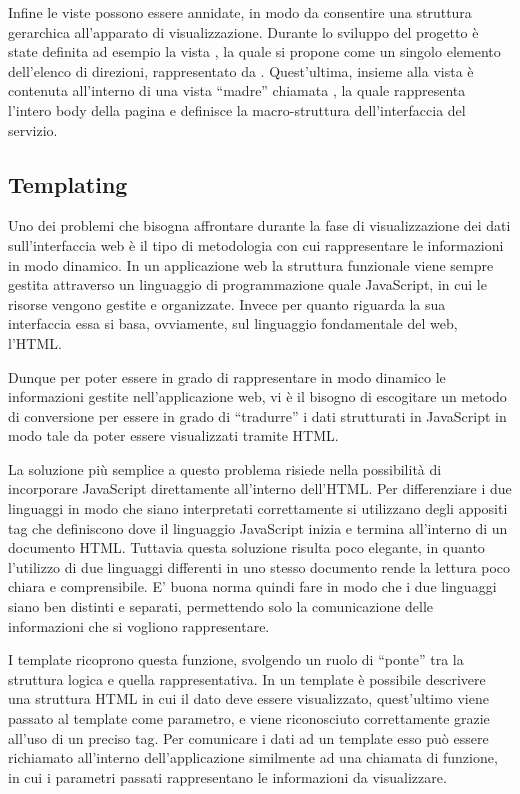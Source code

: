 Infine le viste possono essere annidate, in modo da consentire una struttura gerarchica all'apparato di visualizzazione. Durante lo sviluppo del progetto è state definita ad esempio la vista , la quale si propone come un singolo elemento dell'elenco di direzioni, rappresentato da . Quest'ultima, insieme alla vista  è contenuta all'interno di una vista ``madre'' chiamata , la quale rappresenta l'intero body della pagina e definisce la macro-struttura dell'interfaccia del servizio.

\subsection{Templating} %
\label{sub:templating}

Uno dei problemi che bisogna affrontare durante la fase di visualizzazione dei dati sull'interfaccia web è il tipo di metodologia con cui rappresentare le informazioni in modo dinamico. In un applicazione web la struttura funzionale viene sempre gestita attraverso un linguaggio di programmazione quale JavaScript, in cui le risorse vengono gestite e organizzate. Invece per quanto riguarda la sua interfaccia essa si basa, ovviamente, sul linguaggio fondamentale del web, l'HTML.

Dunque per poter essere in grado di rappresentare in modo dinamico le informazioni gestite nell'applicazione web, vi è il bisogno di escogitare un metodo di conversione per essere in grado di ``tradurre'' i dati strutturati in JavaScript in modo tale da poter essere visualizzati tramite HTML.

La soluzione più semplice a questo problema risiede nella possibilità di incorporare JavaScript direttamente all'interno dell'HTML. Per differenziare i due linguaggi in modo che siano interpretati correttamente si utilizzano degli appositi tag che definiscono dove il linguaggio JavaScript inizia e termina all'interno di un documento HTML. Tuttavia questa soluzione risulta poco elegante, in quanto l'utilizzo di due linguaggi differenti in uno stesso documento rende la lettura poco chiara e comprensibile. E' buona norma quindi fare in modo che i due linguaggi siano ben distinti e separati, permettendo solo la comunicazione delle informazioni che si vogliono rappresentare.

I template ricoprono questa funzione, svolgendo un ruolo di ``ponte'' tra la struttura logica e quella rappresentativa. In un template è possibile descrivere una struttura HTML in cui il dato deve essere visualizzato, quest'ultimo viene passato al template come parametro, e viene riconosciuto correttamente grazie all'uso di un preciso tag. Per comunicare i dati ad un template esso può essere richiamato all'interno dell'applicazione similmente ad una chiamata di funzione, in cui i parametri passati rappresentano le informazioni da visualizzare.

